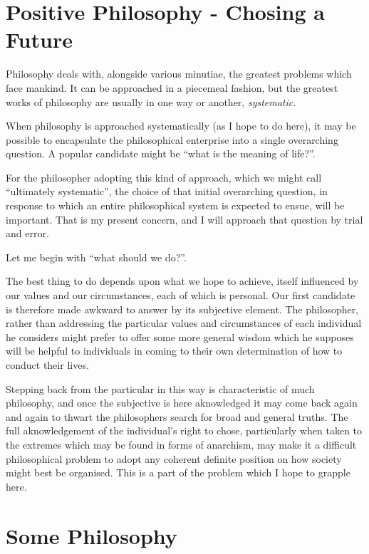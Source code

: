 \documentclass[10pt,titlepage]{article}
\begin{document}
\section{Positive Philosophy - Chosing a Future}

Philosophy deals with, alongside various minutiae, the greatest problems which face mankind.
It can be approached in a piecemeal fashion, but the greatest works of philosophy are usually in one way or another, \emph{systematic}.

When philosophy is approached systematically (as I hope to do here), it may be possible to encapsulate the philosophical enterprise into a single overarching question.
A popular candidate might be ``what is the meaning of life?''.

For the philosopher adopting this kind of approach, which we might call ``ultimately systematic'', the choice of that initial overarching question, in response to which an entire philosophical system is expected to ensue, will be important.
That is my present concern, and I will approach that question by trial and error.

Let me begin with ``what should we do?''.

The best thing to do depends upon what we hope to achieve, itself influenced by our values and our circumstances, each of which is personal.
Our first candidate is therefore made awkward to answer by its subjective element.
The philosopher, rather than addressing the particular values and circumstances of each individual he considers might prefer to offer some more general wisdom which he supposes will be helpful to individuals in coming to their own determination of how to conduct their lives.

Stepping back from the particular in this way is characteristic of much philosophy, and once the subjective is here aknowledged it may come back again and again to thwart the philosophers search for broad and general truths.
The full aknowledgement of the individual's right to chose, particularly when taken to the extremes which may be found in forms of anarchism, may make it a difficult philosophical problem to adopt any coherent definite position on how society might best be organised.
This is a part of the problem which I hope to grapple here.

\section{Some Philosophy}
\end{document}

